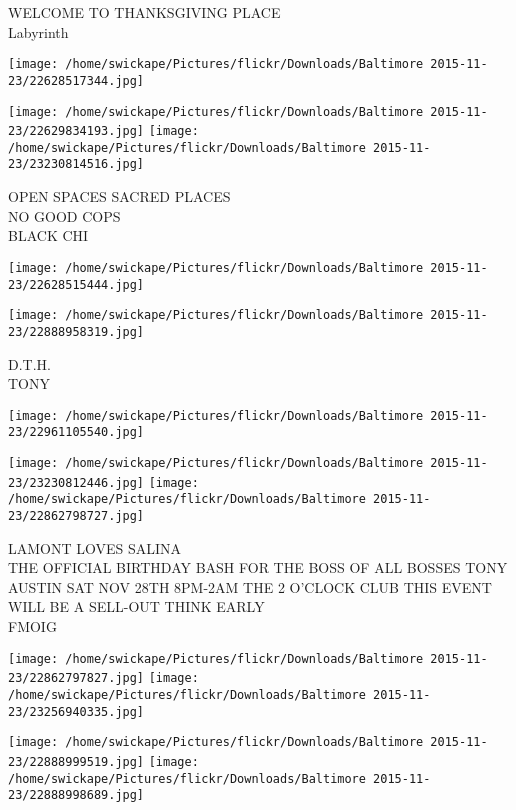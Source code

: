 \documentclass[10pt,letterpaper]{article}
\begin{document}
WELCOME TO THANKSGIVING PLACE\\
Labyrinth\\
\pagebreak

\texttt{[image: /home/swickape/Pictures/flickr/Downloads/Baltimore 2015-11-23/22628517344.jpg]}

\vspace{0.25in}
\texttt{[image: /home/swickape/Pictures/flickr/Downloads/Baltimore 2015-11-23/22629834193.jpg]}
\texttt{[image: /home/swickape/Pictures/flickr/Downloads/Baltimore 2015-11-23/23230814516.jpg]}

OPEN SPACES SACRED PLACES\\
NO GOOD COPS\\
BLACK CHI\\
\pagebreak

\texttt{[image: /home/swickape/Pictures/flickr/Downloads/Baltimore 2015-11-23/22628515444.jpg]}

\vspace{0.25in}
\texttt{[image: /home/swickape/Pictures/flickr/Downloads/Baltimore 2015-11-23/22888958319.jpg]}

D.T.H.\\
TONY\\
\pagebreak

\texttt{[image: /home/swickape/Pictures/flickr/Downloads/Baltimore 2015-11-23/22961105540.jpg]}

\vspace{0.25in}
\texttt{[image: /home/swickape/Pictures/flickr/Downloads/Baltimore 2015-11-23/23230812446.jpg]}
\texttt{[image: /home/swickape/Pictures/flickr/Downloads/Baltimore 2015-11-23/22862798727.jpg]}

LAMONT LOVES SALINA\\
THE OFFICIAL BIRTHDAY BASH FOR THE BOSS OF ALL BOSSES TONY AUSTIN SAT NOV 28TH 8PM{-}2AM THE 2 O'CLOCK CLUB THIS EVENT WILL BE A SELL{-}OUT THINK EARLY\\
FMOIG\\
\pagebreak

\texttt{[image: /home/swickape/Pictures/flickr/Downloads/Baltimore 2015-11-23/22862797827.jpg]}
\texttt{[image: /home/swickape/Pictures/flickr/Downloads/Baltimore 2015-11-23/23256940335.jpg]}

\texttt{[image: /home/swickape/Pictures/flickr/Downloads/Baltimore 2015-11-23/22888999519.jpg]}
\texttt{[image: /home/swickape/Pictures/flickr/Downloads/Baltimore 2015-11-23/22888998689.jpg]}
\end{document}
